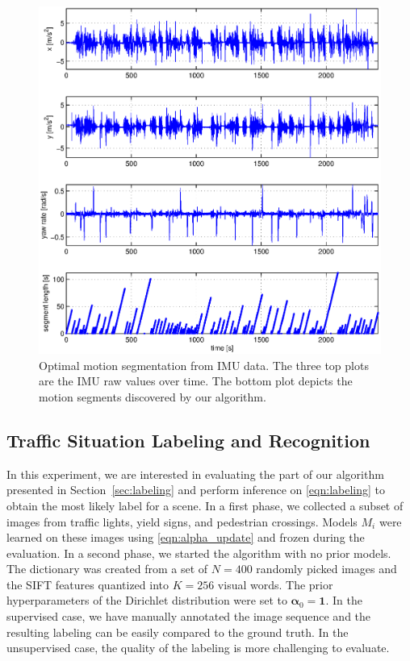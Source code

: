 \begin{figure}[t]
\centering
\includegraphics[width=0.8\columnwidth]{fig/cpResult.eps}
\caption{Optimal motion segmentation from IMU data. The three top plots are the
IMU raw values over time. The bottom plot depicts the motion segments
discovered by our algorithm.}
\label{fig:motion_segments}
\end{figure}

\subsection{Traffic Situation Labeling and Recognition}
In this experiment, we are interested in evaluating the part of our algorithm
presented in Section~\ref{sec:labeling} and perform inference on
\eqref{eqn:labeling} to obtain the most likely label for a scene. In a first
phase, we collected a subset of images from traffic lights, yield signs, and
pedestrian crossings. Models $M_i$ were learned on these images using
\eqref{eqn:alpha_update} and frozen during the evaluation. In a second phase,
we started the algorithm with no prior models. The dictionary was created from a
set of $N=400$ randomly picked images and the SIFT features quantized into
$K=256$ visual words. The prior hyperparameters of the Dirichlet distribution
were set to $\boldsymbol{\alpha}_0=\mathbf{1}$. In the supervised
case, we have manually annotated the image sequence and the resulting labeling
can be easily compared to the ground truth. In the unsupervised case, the
quality of the labeling is more challenging to evaluate.

